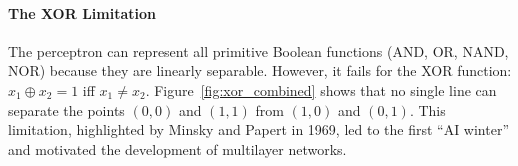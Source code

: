 \documentclass{tufte-handout}
\begin{document}
\begin{marginfigure}
\centering
{}
\caption{Geometric interpretation of the perceptron: the weight vector $\mathbf{w}$ is orthogonal to the decision hyperplane and points toward the positive class.}
\end{marginfigure}

\paragraph{The XOR Limitation}

The perceptron can represent all primitive Boolean functions (AND, OR, NAND, NOR) because they are linearly separable. However, it fails for the XOR function: $x_1 \oplus x_2 = 1$ iff $x_1 \neq x_2$. Figure~\ref{fig:xor_combined} shows that no single line can separate the points $(0,0)$ and $(1,1)$ from $(1,0)$ and $(0,1)$. This limitation, highlighted by Minsky and Papert in 1969, led to the first “AI winter” and motivated the development of multilayer networks.
\end{document}
